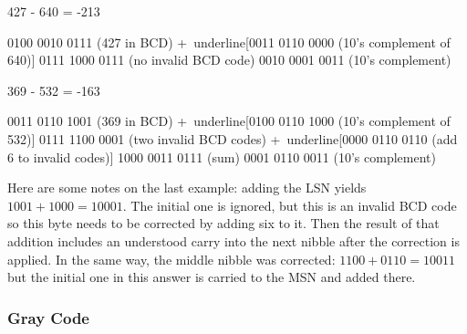 \begin{minipage}{\linewidth} %
\begin{binDisp}[commandchars=~\[\]]

    427 - 640 = -213

          0100 0010 0111  (427 in BCD)
         +~underline[0011 0110 0000  (10's complement of 640)]
          0111 1000 0111  (no invalid BCD code)
          0010 0001 0011  (10's complement)

\end{binDisp}
\end{minipage}

\begin{minipage}{\linewidth} %

\begin{binDisp}[commandchars=~\[\]]

    369 - 532 = -163

          0011 0110 1001  (369 in BCD)
         +~underline[0100 0110 1000  (10's complement of 532)]
          0111 1100 0001  (two invalid BCD codes)
         +~underline[0000 0110 0110  (add 6 to invalid codes)]
          1000 0011 0111  (sum)
          0001 0110 0011  (10's complement)

\end{binDisp}
\end{minipage}

Here are some notes on the last example: adding the \ac{LSN} yields $ 1001+1000=10001 $. The initial one is ignored, but this is an invalid \ac{BCD} code so this byte needs to be corrected by adding six to it. Then the result of that addition includes an understood carry into the next nibble after the correction is applied. In the same way, the middle nibble was corrected: $ 1100+0110=10011 $ but the initial one in this answer is carried to the \ac{MSN} and added there.

\subsubsection{Gray Code}
\label{MO:subsub:gray_code}

